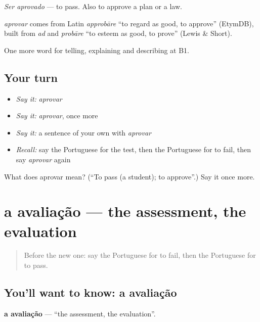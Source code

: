 \emph{Ser aprovado} — to pass. Also to approve a plan or a law.

\begin{cousinweb}
\emph{aprovar} comes from Latin \emph{approbāre} \textquotedblleft{}to regard as good, to approve\textquotedblright{} (EtymDB), built from \emph{ad} and \emph{probāre} \textquotedblleft{}to esteem as good, to prove\textquotedblright{} (Lewis \& Short).
\end{cousinweb}

\begin{grammarlens}[title={What you've built}]
One more word for telling, explaining and describing at B1.
\end{grammarlens}

\subsection*{Your turn}
\begin{itemize}
\raggedright
  \item \emph{Say it:} \emph{aprovar}
  \item \emph{Say it:} \emph{aprovar}, once more
  \item \emph{Say it:} a sentence of your own with \emph{aprovar}
  \item \emph{Recall:} say the Portuguese for the test, then the Portuguese for to fail, then say \emph{aprovar} again
\end{itemize}

\begin{tcolorbox}[breakable,colback=teal!4,colframe=teal!35!black,title={Before you move on}]
What does aprovar mean? (\textquotedblleft{}To pass (a student); to approve\textquotedblright{}.) Say it once more.
\end{tcolorbox}
\section[a avaliação]{a avaliação — the assessment, the evaluation}

\label{lesson:PT-C379-avaliacao}



\begin{quote}
Before the new one: say the Portuguese for to fail, then the Portuguese for to pass.
\end{quote}

\subsection*{You'll want to know: a avaliação}
\textbf{a avaliação} — \textquotedblleft{}the assessment, the evaluation\textquotedblright{}.

